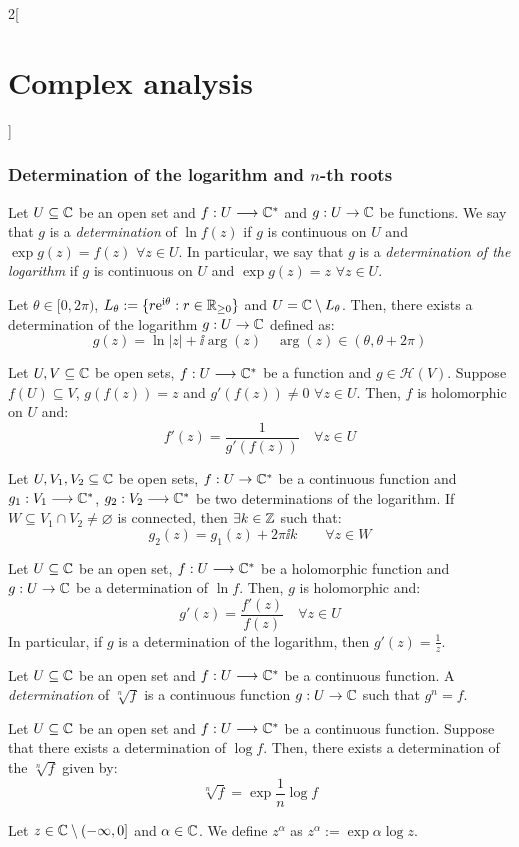 \documentclass[../../../main.tex]{subfiles}
\begin{document}
\begin{multicols}{2}[\section{Complex analysis}]
  \subsubsection{Determination of the logarithm and \texorpdfstring{$n$}{n}-th roots}
  \begin{definition}
    Let $U\subseteq\mathbb{C}$ be an open set and $f:U\longrightarrow\mathbb{C}^*$ and $g:U\rightarrow\mathbb{C}$ be functions. We say that $g$ is a \emph{determination} of $\ln f(z)$ if $g$ is continuous on $U$ and $\exp{g(z)}=f(z)$ $\forall z\in U$. In particular, we say that $g$ is a \emph{determination of the logarithm} if $g$ is continuous on $U$ and $\exp{g(z)}=z$ $\forall z\in U$.
  \end{definition}
  \begin{proposition}
    Let $\theta\in[0,2\pi)$, $L_\theta:=\{r\mathrm{e}^{\mathrm{i}\theta}:r\in\mathbb{R}_{\geq 0}\}$ and $U=\mathbb{C}\setminus L_\theta$. Then, there exists a determination of the logarithm $g:U\rightarrow\mathbb{C}$ defined as:
    $$g(z)=\ln |z|+\ii\arg(z)\quad\arg(z)\in(\theta,\theta+2\pi)$$
  \end{proposition}
  \begin{theorem}
    Let $U,V\subseteq\mathbb{C}$ be open sets, $f:U\longrightarrow\mathbb{C}^*$ be a function and $g\in\mathcal{H}(V)$. Suppose $f(U)\subseteq V$, $g(f(z))=z$ and $g'(f(z))\ne 0$ $\forall z\in U$. Then, $f$ is holomorphic on $U$ and: $$f'(z)=\frac{1}{g'(f(z))}\quad\forall z\in U$$
  \end{theorem}
  \begin{proposition}
    Let $U,V_1,V_2\subseteq\mathbb{C}$ be open sets, $f:U\rightarrow\mathbb{C}^*$ be a continuous function and $g_1:V_1\longrightarrow\mathbb{C}^*$, $g_2:V_2\longrightarrow\mathbb{C}^*$ be two determinations of the logarithm. If $W\subseteq V_1\cap V_2\ne\varnothing$ is connected, then $\exists k\in\mathbb{Z}$ such that: $$g_2(z)=g_1(z)+2\pi \ii k\qquad\forall z\in W$$
  \end{proposition}
  \begin{corollary}
    Let $U\subseteq\mathbb{C}$ be an open set, $f:U\longrightarrow\mathbb{C}^*$ be a holomorphic function and $g:U\rightarrow\mathbb{C}$ be a determination of $\ln f$. Then, $g$ is holomorphic and: $$g'(z)=\frac{f'(z)}{f(z)}\quad \forall z\in U$$
    In particular, if $g$ is a determination of the logarithm, then $g'(z)=\frac{1}{z}$.
  \end{corollary}
  \begin{definition}
    Let $U\subseteq\mathbb{C}$ be an open set and $f:U\longrightarrow\mathbb{C}^*$ be a continuous function. A \emph{determination} of $\sqrt[n]{f}$ is a continuous function $g:U\rightarrow\mathbb{C}$ such that $g^n=f$.
  \end{definition}
  \begin{proposition}
    Let $U\subseteq\mathbb{C}$ be an open set and $f:U\longrightarrow\mathbb{C}^*$ be a continuous function. Suppose that there exists a determination of $\log f$. Then, there exists a determination of the $\sqrt[n]{f}$ given by: $$\sqrt[n]{f}=\exp{\frac{1}{n}\log f}$$
  \end{proposition}
  \begin{definition}
    Let $z\in\mathbb{C}\setminus(-\infty,0]$ and $\alpha\in\mathbb{C}$. We define $z^\alpha$ as $z^\alpha:=\exp{\alpha\log z}$.
  \end{definition}

\end{multicols}
\end{document}
